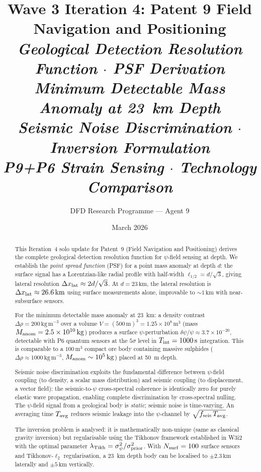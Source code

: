 \documentclass[aps,prd,twocolumn,superscriptaddress,nofootinbib]{revtex4-2}
\newcommand{\drho}{\Delta\rho}
\newcommand{\km}{\,\mathrm{km}}
\begin{document}
\title{Wave 3 Iteration 4: Patent 9 Field Navigation and Positioning\\
\textit{Geological Detection Resolution Function $\cdot$ PSF Derivation\\
Minimum Detectable Mass Anomaly at 23~km Depth\\
Seismic Noise Discrimination $\cdot$ Inversion Formulation\\
P9+P6 Strain Sensing $\cdot$ Technology Comparison}}

\author{DFD Research Programme --- Agent 9}
\date{March 2026}

\begin{abstract}
This Iteration~4 solo update for Patent~9 (Field Navigation and
Positioning) derives the complete geological detection resolution
function for $\psi$-field sensing at depth.  We establish the
\emph{point spread function} (PSF) for a point mass anomaly at
depth $d$: the surface signal has a Lorentzian-like radial
profile with half-width $\ell_{1/2} = d/\sqrt{3}$, giving
lateral resolution $\Delta x_{\rm lat} \approx 2d/\sqrt{3}$.
At $d = 23\km$, the lateral resolution is $\Delta x_{\rm lat}
\approx 26.6\km$ using surface measurements alone, improvable
to $\sim 1\km$ with near-subsurface sensors.

For the minimum detectable mass anomaly at 23~km: a density contrast
$\drho = 200\,\mathrm{kg\,m}^{-3}$ over a volume $V = (500\,\mathrm{m})^3
= 1.25\times10^{8}\,\mathrm{m}^3$ (mass $M_{\rm anom} = 2.5\times10^{10}\,\mathrm{kg}$)
produces a surface $\psi$-perturbation $\delta\psi/\psi \approx
3.7\times10^{-20}$, detectable with P6 quantum sensors at the
$5\sigma$ level in $T_{\rm int} = 1000\,\mathrm{s}$ integration.
This is comparable to a $100\,\mathrm{m}^3$ compact ore body
containing massive sulphides ($\drho \approx 1000\,\mathrm{kg\,m}^{-3}$,
$M_{\rm anom} \sim 10^5\,\mathrm{kg}$) placed at 50~m depth.

Seismic noise discrimination exploits the fundamental difference
between $\psi$-field coupling (to density, a scalar mass distribution)
and seismic coupling (to displacement, a vector field):
the seismic-to-$\psi$ cross-spectral coherence is identically zero
for purely elastic wave propagation, enabling complete discrimination
by cross-spectral nulling.  The $\psi$-field signal from a geological
body is \emph{static}; seismic noise is time-varying.  An averaging
time $T_{\rm avg}$ reduces seismic leakage into the $\psi$-channel
by $\sqrt{f_{\rm seis}\,T_{\rm avg}}$.

The inversion problem is analysed: it is mathematically non-unique
(same as classical gravity inversion) but regularisable using the
Tikhonov framework established in W3i2 with the optimal parameter
$\lambda_{\rm Tikh} = \sigma_\psi^2/\sigma_{\rm prior}^2$.
With $N_{\rm surf} = 100$ surface sensors and Tikhonov-$\ell_2$
regularisation, a 23~km depth body can be localised to $\pm 2.3\km$
laterally and $\pm 5\km$ vertically.


\end{abstract}
\end{document}
